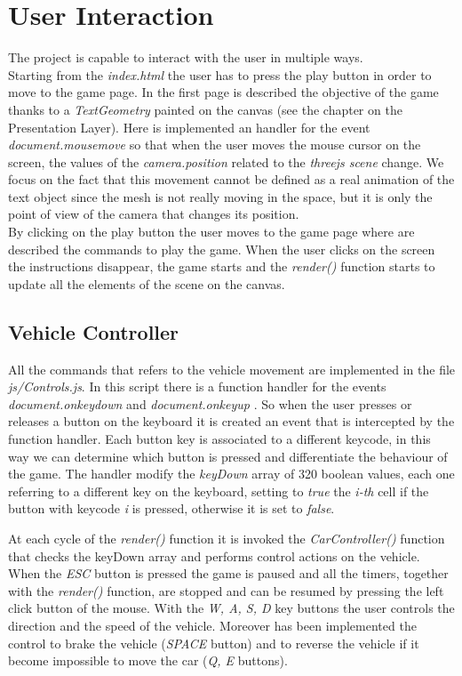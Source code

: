 \documentclass[a4paper, 11pt, titlepage]{report}
\begin{document}
\chapter{User Interaction}
	\par The project is capable to interact with the user in multiple ways. \\
	Starting from the \emph{index.html} the user has to press the play button in order to move to the game page. In the first page is described the objective of the game thanks to a \emph{TextGeometry} painted on the canvas (see the chapter on the Presentation Layer). Here is implemented an handler for the event \emph{document.mousemove} \cite{jsevents} so that when the user moves the mouse cursor on the screen, the values of the \emph{camera.position} related to the \emph{threejs scene} change. We focus on the fact that this movement cannot be defined as a real animation of the text object since the mesh is not really moving in the space, but it is only the point of view of the camera that changes its position. \\
	By clicking on the play button the user moves to the game page where are described the commands to play the game. When the user clicks on the screen the instructions disappear, the game starts and the \emph{render()} function starts to update all the elements of the scene on the canvas.\\
	\section{Vehicle Controller}
		\par All the commands that refers to the vehicle movement are implemented in the file \emph{js/Controls.js}. In this script there is a function handler for the events \emph{document.onkeydown} and \emph{document.onkeyup} \cite{jsevents}. So when the user presses or releases a button on the keyboard it is created an event that is intercepted by the function handler. Each button key is associated to a different keycode, in this way we can determine which button is pressed and differentiate the behaviour of the game. The handler modify the \emph{keyDown} array of 320 boolean values, each one referring to a different key on the keyboard, setting to \emph{true} the \emph{i-th} cell if the button with keycode \emph{i} is pressed, otherwise it is set to \emph{false}.
		\par At each cycle of the \emph{render()} function it is invoked the \emph{CarController()} function that checks the keyDown array and performs control actions on the vehicle.\\
		When the \emph{ESC} button is pressed the game is paused and all the timers, together with the \emph{render()} function, are stopped and can be resumed by pressing the left click button of the mouse. With the \emph{W, A, S, D} key buttons the user controls the direction and the speed of the vehicle. Moreover has been implemented the control to brake the vehicle (\emph{SPACE} button) and to reverse the vehicle if it become impossible to move the car (\emph{Q, E} buttons).\\
\end{document}
